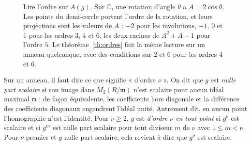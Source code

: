 \documentclass[11pt,a4paper]{amsart}
\theoremstyle{definition}
\theoremstyle{plain}
\theoremstyle{remark}
\theoremstyle{plain}
\begin{document}
\begin{figure}[htbp]
\centering
{}
\caption{Lire l'ordre sur $A(g)$. Sur $\mathbb C$, une rotation d'angle $\theta$ a $A = 2\cos\theta$. Les points du demi-cercle portent l'ordre de la rotation, et leurs projections sont les valeurs de $A$ : $-2$ pour les involutions, $-1$, $0$ et $1$ pour les ordres $3$, $4$ et $6$, les deux racines de $A^2 + A - 1$ pour l'ordre $5$. Le théorème~\ref{th:ordres} fait la même lecture sur un anneau quelconque, avec des conditions sur $2$ et $6$ pour les ordres $4$ et $6$.}\label{fig:ordres}
\end{figure}

Sur un anneau, il faut dire ce que signifie « d'ordre $\nu$ ». On dit que $g$ est \emph{nulle part scalaire} si son image dans $M_2(R/\mathfrak m)$ n'est scalaire pour aucun idéal maximal $\mathfrak m$ ; de façon équivalente, les coefficients hors diagonale et la différence des coefficients diagonaux engendrent l'idéal unité. Autrement dit, en aucun point l'homographie n'est l'identité. Pour $\nu \ge 2$, $g$ est \emph{d'ordre $\nu$ en tout point} si $g^\nu$ est scalaire et si $g^m$ est nulle part scalaire pour tout diviseur $m$ de $\nu$ avec $1 \le m < \nu$. Pour $\nu$ premier et $g$ nulle part scalaire, cela revient à dire que $g^\nu$ est scalaire.
\end{document}
